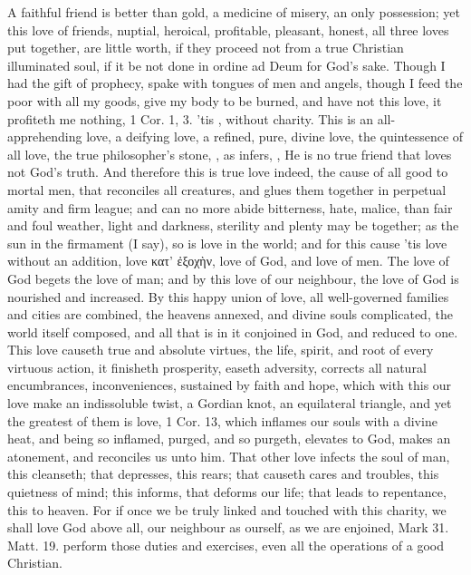 {A faithful friend is better than gold, a medicine of
misery, an only possession; yet this love of friends, nuptial,
heroical, profitable, pleasant, honest, all three loves put together,
are little worth, if they proceed not from a true Christian illuminated
soul, if it be not done in ordine ad Deum for God's sake. Though I had
the gift of prophecy, spake with tongues of men and angels, though I
feed the poor with all my goods, give my body to be burned, and have
not this love, it profiteth me nothing, 1 Cor.  1, 3. 'tis
, without charity. This is an all-apprehending love,
a deifying love, a refined, pure, divine love, the quintessence of all
love, the true philosopher's stone, , as \Austin{}
infers, , He is no true friend that loves not God's truth. And
therefore this is true love indeed, the cause of all good to mortal
men, that reconciles all creatures, and glues them together in
perpetual amity and firm league; and can no more abide bitterness,
hate, malice, than fair and foul weather, light and darkness, sterility
and plenty may be together; as the sun in the firmament (I say), so is
love in the world; and for this cause 'tis love without an addition,
love \textgreek{κατ' ἐξοχὴν}, love of God, and love of men. The love of God
begets the love of man; and by this love of our neighbour, the love of
God is nourished and increased. By this happy union of love, all
well-governed families and cities are combined, the heavens annexed,
and divine souls complicated, the world itself composed, and all that
is in it conjoined in God, and reduced to one. This love causeth
true and absolute virtues, the life, spirit, and root of every virtuous
action, it finisheth prosperity, easeth adversity, corrects all natural
encumbrances, inconveniences, sustained by faith and hope, which with
this our love make an indissoluble twist, a Gordian knot, an
equilateral triangle, and yet the greatest of them is love, 1 Cor.
 13, which inflames our souls with a divine heat, and being
so inflamed, purged, and so purgeth, elevates to God, makes an
atonement, and reconciles us unto him.  That other love infects
the soul of man, this cleanseth; that depresses, this rears; that
causeth cares and troubles, this quietness of mind; this informs, that
deforms our life; that leads to repentance, this to heaven. For if once
we be truly linked and touched with this charity, we shall love God
above all, our neighbour as ourself, as we are enjoined, Mark  31.
Matt.  19. perform those duties and exercises, even all the
operations of a good Christian.

}
